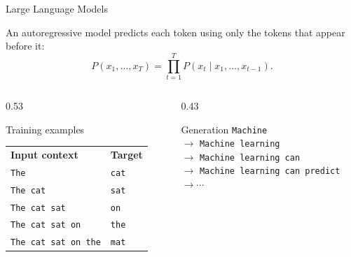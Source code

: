\documentclass[aspectratio=169,12pt]{beamer}
\begin{document}
\begin{frame}{Large Language Models}
	
	  \vspace{0.15cm}
	
		An autoregressive model predicts each token using only the
		tokens that appear before it:
		\[
		P(x_1,\ldots,x_T)
		=
		\prod_{t=1}^{T} P(x_t\mid x_1,\ldots,x_{t-1}).
		\]
	
	\vspace{-0.2cm}
	
	\begin{columns}[T,onlytextwidth]
		
		\begin{column}{0.53\textwidth}
			\begin{exampleblock}{Training examples}
				\small
				\begin{tabular}{ll}
					\textbf{Input context} & \textbf{Target}\\[0.12cm]
					\texttt{The}              & \texttt{cat}\\
					\texttt{The cat}          & \texttt{sat}\\
					\texttt{The cat sat}      & \texttt{on}\\
					\texttt{The cat sat on}   & \texttt{the}\\
					\texttt{The cat sat on the} & \texttt{mat}
				\end{tabular}
			\end{exampleblock}
		\end{column}
		
		\begin{column}{0.43\textwidth}
			\begin{exampleblock}{Generation}
				\small
				\texttt{Machine}\\
				$\longrightarrow$ \texttt{Machine learning}\\
				$\longrightarrow$ \texttt{Machine learning can}\\
				$\longrightarrow$ \texttt{Machine learning can predict}\\
				$\longrightarrow \cdots$
			\end{exampleblock}
		\end{column}
		
	\end{columns}
	

\end{frame}
\end{document}
